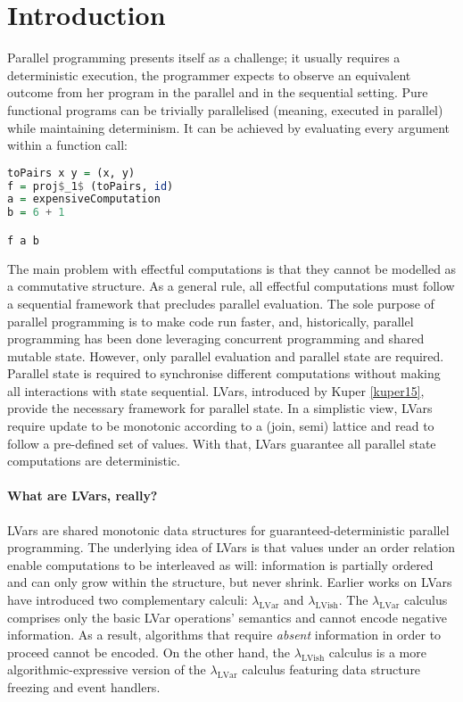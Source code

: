 \documentclass[main.tex]{subfiles}
\begin{document}
\section{Introduction}


Parallel programming presents itself as a challenge; it usually requires a deterministic execution, \ie the programmer expects to observe an equivalent outcome from her program in the parallel and in the sequential setting. Pure functional programs can be trivially parallelised (meaning, executed in parallel) while maintaining determinism. It can be achieved by evaluating every argument within a function call:

\begin{lstlisting}[language=Haskell]
toPairs x y = (x, y)
f = proj$_1$ (toPairs, id)
a = expensiveComputation
b = 6 + 1

f a b
\end{lstlisting}

The main problem with effectful computations is that they cannot be modelled as a commutative structure. As a general rule, all effectful computations must follow a sequential framework that precludes parallel evaluation. The sole purpose of parallel programming is to make code run faster, and, historically, parallel programming has been done leveraging concurrent programming and shared mutable state. However, only parallel evaluation and parallel state are required. Parallel state is required to synchronise different computations without making all interactions with state sequential. LVars, introduced by Kuper \ref{kuper15}, provide the necessary framework for parallel state. In a simplistic view, LVars require update to be monotonic according to a (join, semi) lattice and read to follow a pre-defined set of values. With that, LVars guarantee all parallel state computations are deterministic.

\paragraph{What are LVars, really?} LVars are shared monotonic data structures for guaranteed-deterministic parallel programming. The underlying idea of LVars is that values under an order relation enable computations to be interleaved as will: information is partially ordered and can only grow within the structure, but never shrink. Earlier works on LVars have introduced two complementary calculi: $\lambda_{\text{LVar}}$ and $\lambda_{\text{LVish}}$. The $\lambda_{\text{LVar}}$ calculus comprises only the basic LVar operations' semantics and cannot encode negative information. As a result, algorithms that require \textit{absent} information in order to proceed cannot be encoded. On the other hand, the $\lambda_{\text{LVish}}$ calculus is a more algorithmic-expressive version of the $\lambda_{\text{LVar}}$ calculus featuring data structure freezing and event handlers.
\end{document}
